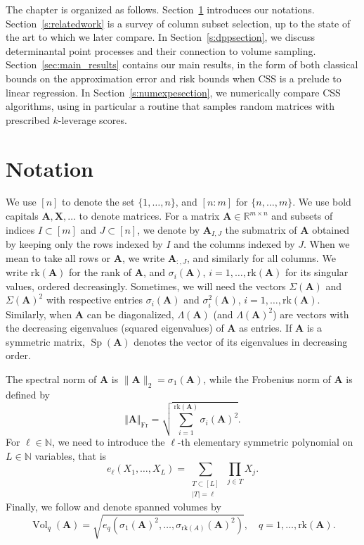 \documentclass[twoside,11pt]{book}
\numberwithin{theorem}{chapter}
\numberwithin{definition}{chapter}
\numberwithin{proposition}{chapter}
\numberwithin{corollary}{chapter}
\numberwithin{example}{chapter}
\numberwithin{lemma}{chapter}
\numberwithin{assumption}{chapter}
\numberwithin{equation}{chapter}
\numberwithin{figure}{chapter}
\DeclareMathOperator{\Sp}{\mathrm{Sp}}
\DeclareMathOperator{\Vol}{Vol}
\DeclareMathOperator{\Fr}{\mathrm{Fr}}
\def\rk{\text{rk}}
\begin{document}
The chapter is organized as follows. Section~\ref{s:notation} introduces our notations. Section~\ref{s:relatedwork} is a survey of column subset selection, up to the state of the art to which we later compare. In Section~\ref{s:dppsection}, we discuss determinantal point processes and their connection to volume sampling. Section~\ref{sec:main_results} contains our main results, in the form of both classical bounds on the approximation error and risk bounds when CSS is a prelude to linear regression. In Section~\ref{s:numexpesection}, we numerically compare CSS algorithms, using in particular a routine that samples random matrices with prescribed $k$-leverage scores.

\section{Notation}
\label{s:notation}
We use $[n]$ to denote the set $\{1,\dots,n\}$, and $[n:m]$ for $\{n,\dots,m\}$. We use bold capitals $\bm{A},\bm{X},\dots$ to denote matrices. For a matrix $\bm{A} \in \mathbb{R}^{m \times n}$ and subsets of indices $I\subset[m]$ and $J\subset[n]$, we denote by $\bm{A}_{I,J}$ the submatrix of $\bm{A}$ obtained by keeping only the rows indexed by $I$ and the columns indexed by $J$. When we mean to take all rows or $\bm{A}$, we write $\bm A_{:,J}$, and similarly for all columns. We write $\rk (\bm{A})$ for the rank of $\bm{A}$, and $\sigma_i(\bm A)$, $i=1,\dots,\rk(\bm{A})$ for its singular values, ordered decreasingly. Sometimes, we will need the vectors $\Sigma(\bm{A})$ and $\Sigma(\bm{A})^2$ with respective entries $\sigma_i(\bm{A})$ and $\sigma_i^2(\bm{A})$, $i=1,\dots,\rk(\bm{A})$. Similarly, when $\bm{A}$ can be diagonalized, $\Lambda(\bm{A})$ (and $\Lambda(\bm{A})^2$) are vectors with the decreasing eigenvalues (squared eigenvalues) of $\bm{A}$ as entries. If $\bm{A}$ is a symmetric matrix, $\Sp(\bm{A})$ denotes the vector of its eigenvalues in decreasing order.

The spectral norm of $\bm{A}$ is $\|\bm{A}\|_{2} = \sigma_{1}(\bm A)$, while the Frobenius norm of $\bm{A}$ is defined by
$$\Vert\bm{A}\Vert_{\Fr} = \sqrt{\sum_{i=1}^{\rk(\bm{A})} \sigma_{i}(\bm{A})^{2}}.$$
For $\ell \in \mathbb{N}$, we need to introduce the $\ell$-th elementary symmetric polynomial on $L \in \mathbb{N}$ variables, that is
\begin{equation}
e_{\ell}(X_{1}, \dots, X_{L}) = \sum\limits_{\substack{T \subset [L]\\|T| = \ell}}~ \prod\limits_{j \in T} X_{j}.
\end{equation}
Finally, we follow \cite{Ben92} and denote spanned volumes by
$$\Vol_{q}(\bm{A}) = \sqrt{e_{q}\left(\sigma_{1}(\bm{A})^{2},\dots,\sigma_{\rk(A)}(\bm{A})^2\right)}, \quad q=1,\dots,\rk(\bm{A}).$$
\end{document}
